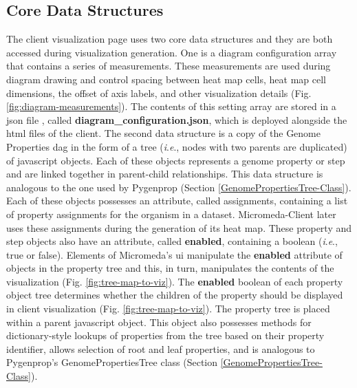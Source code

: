 \subsection{Core Data Structures} \label{visual-data-structures}

The client visualization page uses two core data structures and they are both 
accessed during visualization generation. One is a diagram configuration array 
that contains a series of measurements. These measurements are used during 
diagram drawing and control spacing between heat map cells, heat map cell 
dimensions, the offset of axis labels, and other visualization details (Fig. 
\ref{fig:diagram-measurements}). The contents of this setting array are stored 
in a \gls{json} file \cite{bray2014rfc}, called 
\textbf{diagram\_configuration.json}, which is deployed alongside the \gls{html} 
files of the client. The second data structure is a copy of the Genome 
Properties \gls{dag} in the form of a tree (\textit{i}.\textit{e}., nodes with two parents are 
duplicated) of \gls{javascript} objects. Each of these objects represents a 
genome property or step and are linked together in parent-child relationships. 
This data structure is analogous to the one used by Pygenprop (Section 
\ref{GenomePropertiesTree-Class}). Each of these objects possesses an attribute, 
called assignments, containing a list of property assignments for the organism 
in a dataset. Micromeda-Client later uses these assignments during the 
generation of its heat map. These property and step objects also have an 
attribute, called \textbf{enabled}, containing a boolean (\textit{i}.\textit{e}., true or false). 
Elements of Micromeda's \gls{ui} manipulate the \textbf{enabled} attribute of 
objects in the property tree and this, in turn, manipulates the contents of the 
visualization (Fig. \ref{fig:tree-map-to-viz}). The \textbf{enabled} boolean of 
each property object tree determines whether the children of the property should 
be displayed in client visualization (Fig. \ref{fig:tree-map-to-viz}). The 
property tree is placed within a parent \gls{javascript} object. This object 
also possesses methods for dictionary-style lookups of properties from the tree 
based on their property identifier, allows selection of root and leaf 
properties, and is analogous to Pygenprop's GenomePropertiesTree class (Section 
\ref{GenomePropertiesTree-Class}).

